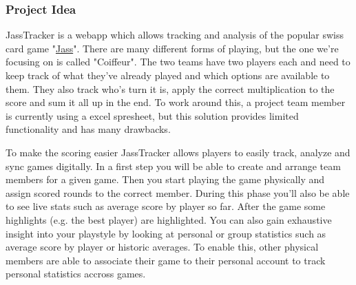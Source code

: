 


\subsubsection*{Project Idea}

JassTracker is a webapp which allows tracking and analysis of the popular swiss card game "\href{https://de.wikipedia.org/wiki/Jass}{Jass}".
There are many different forms of playing, but the one we're focusing on is called "Coiffeur".
The two teams have two players each and need to keep track of what they've already played and which options are available to them.
They also track who's turn it is, apply the correct multiplication to the score and sum it all up in the end.
To work around this, a project team member is currently using a excel spresheet, but this solution provides limited functionality and has many drawbacks.

To make the scoring easier JassTracker allows players to easily track, analyze and sync games digitally.
In a first step you will be able to create and arrange team members for a given game.
Then you start playing the game physically and assign scored rounds to the correct member.
During this phase you'll also be able to see live stats such as average score by player so far.
After the game some highlights (e.g. the best player) are highlighted.
You can also gain exhaustive insight into your playstyle by looking at personal or group statistics such as average score by player or historic averages.
To enable this, other physical members are able to associate their game to their personal account to track personal statistics accross games.


